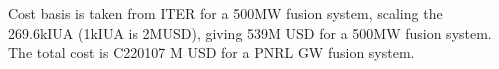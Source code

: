 Cost basis is taken from ITER for a 500MW fusion system, scaling the 269.6kIUA (1kIUA is 2MUSD), giving 539M USD for a 500MW fusion system. The total cost is C220107 M USD for a PNRL GW fusion system.






